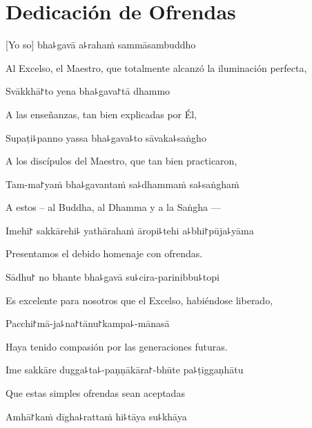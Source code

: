 \chapter{Dedicación de Ofrendas}

[Yo so] bha꜕gavā a꜕rahaṁ sammāsambuddho

\begin{english}
Al Excelso, el Maestro, que totalmente alcanzó la iluminación perfecta,
\end{english}

Svākkhā꜓to yena bha꜕gava꜓tā dhammo

\begin{english}
A las enseñanzas, tan bien explicadas por Él,
\end{english}

Supaṭi꜕panno yassa bha꜕gava꜕to sāvaka꜕saṅgho

\begin{english}
A los discípulos del Maestro, que tan bien practicaron,
\end{english}

Tam-ma꜓yaṁ bha꜕gavantaṁ sa꜕dhammaṁ sa꜕saṅghaṁ

\begin{english}
A estos – al Buddha, al Dhamma y a la Saṅgha ---
\end{english}

Imehi꜓ sakkārehi꜕ yathārahaṁ āropi꜕tehi a꜕bhi꜓pūja꜕yāma

\begin{english}
Presentamos el debido homenaje con ofrendas.
\end{english}

Sādhu꜓ no bhante bha꜕gavā su꜕cira-parinibbu꜕topi

\begin{english}
Es excelente para nosotros que el Excelso, habiéndose liberado, 
\end{english}

Pacchi꜓mā-ja꜕na꜓tānu꜓kampa꜕-mānasā

\begin{english}
Haya tenido compasión por las generaciones futuras.
\end{english}

Ime sakkāre dugga꜕ta꜕-paṇṇākāra꜓-bhūte pa꜕ṭiggaṇhātu

\begin{english}
Que estas simples ofrendas sean aceptadas
\end{english}

Amhā꜓kaṁ dīgha꜕rattaṁ hi꜕tāya su꜕khāya

